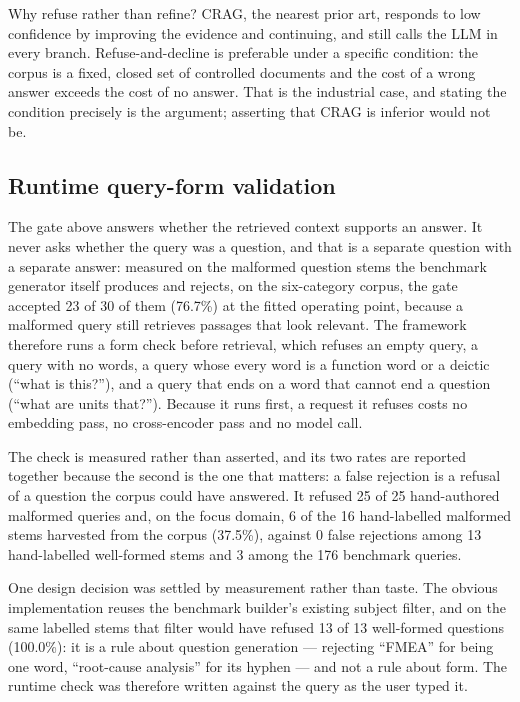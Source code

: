 \documentclass[preprint,3p,times]{elsarticle}
\begin{document}
Why refuse rather than refine? CRAG, the nearest prior art, responds to low
confidence by improving the evidence and continuing, and still calls the LLM in
every branch. Refuse-and-decline is preferable under a specific condition: the
corpus is a fixed, closed set of controlled documents and the cost of a wrong
answer exceeds the cost of no answer. That is the industrial case, and stating
the condition precisely is the argument; asserting that CRAG is inferior would
not be.

\subsection{Runtime query-form validation}

The gate above answers whether the retrieved context supports an answer. It
never asks whether the query was a question, and that is a separate question
with a separate answer: measured on the malformed question stems the benchmark
generator itself produces and rejects, on the six-category corpus, the gate accepted
23 of 30 of them (76.7\%) at the fitted operating
point, because a malformed query still retrieves passages that look relevant.
The framework therefore runs a form check before retrieval, which refuses an
empty query, a query with no words, a query whose every word is a function
word or a deictic (``what is this?''), and a query that ends on a word that
cannot end a question (``what are units that?''). Because it runs first, a
request it refuses costs no embedding pass, no cross-encoder pass and no model
call.

The check is measured rather than asserted, and its two rates are reported
together because the second is the one that matters: a false rejection is a
refusal of a question the corpus could have answered. It refused
25 of 25 hand-authored malformed
queries and, on the focus domain, 6 of the
16 hand-labelled malformed stems harvested from the corpus
(37.5\%), against 0 false
rejections among 13 hand-labelled well-formed stems and
3 among the 176 benchmark queries.

One design decision was settled by measurement rather than taste. The obvious
implementation reuses the benchmark builder's existing subject filter, and on
the same labelled stems that filter would have refused
13 of 13
well-formed questions (100.0\%): it is a rule about
question generation --- rejecting ``FMEA'' for being one word,
``root-cause analysis'' for its hyphen --- and not a rule about form. The
runtime check was therefore written against the query as the user typed it.
\end{document}
